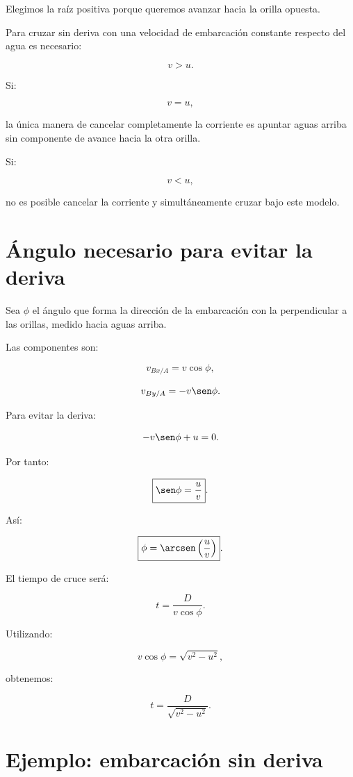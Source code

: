 Elegimos la raíz positiva porque queremos avanzar
hacia la orilla opuesta.

\begin{condicion}

Para cruzar sin deriva con una velocidad de embarcación
constante respecto del agua es necesario:

\[
v>u.
\]

Si:

\[
v=u,
\]

la única manera de cancelar completamente la corriente
es apuntar aguas arriba sin componente de avance
hacia la otra orilla.

Si:

\[
v<u,
\]

no es posible cancelar la corriente y simultáneamente
cruzar bajo este modelo.

\end{condicion}


\section{Ángulo necesario para evitar la deriva}

Sea \(\phi\) el ángulo que forma la dirección de
la embarcación con la perpendicular a las orillas,
medido hacia aguas arriba.

Las componentes son:

\[
v_{Bx/A}=v\cos\phi,
\]

\[
v_{By/A}=-v\sen\phi.
\]

Para evitar la deriva:

\[
-v\sen\phi+u=0.
\]

Por tanto:

\[
\boxed{
\sen\phi=\frac{u}{v}
}.
\]

Así:

\[
\boxed{
\phi=\arcsen\left(\frac{u}{v}\right)
}.
\]

El tiempo de cruce será:

\[
t=\frac{D}{v\cos\phi}.
\]

Utilizando:

\[
v\cos\phi=\sqrt{v^2-u^2},
\]

obtenemos:

\[
\boxed{
t=\frac{D}{\sqrt{v^2-u^2}}
}.
\]


\section{Ejemplo: embarcación sin deriva}

